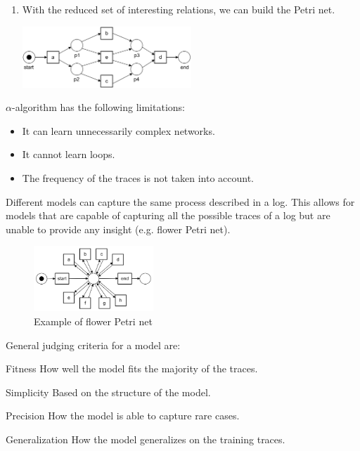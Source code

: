 \begin{description}
\begin{example}
\begin{enumerate}
                \item With the reduced set of interesting relations, we can build the Petri net.
                    \begin{center}
                        \includegraphics[width=0.5\textwidth]{img/alpha_algorithm_example.png}
                    \end{center}
            \end{enumerate}
        \end{example}

        $\alpha$-algorithm has the following limitations:
        \begin{itemize}
            \item It can learn unnecessarily complex networks.
            \item It cannot learn loops.
            \item The frequency of the traces is not taken into account.
        \end{itemize}


    \item[Model evaluation]
        Different models can capture the same process described in a log.
        This allows for models that are capable of capturing all the possible traces of a log but 
        are unable to provide any insight (e.g. flower Petri net).

        \begin{figure}[H]
            \centering
            \includegraphics[width=0.4\textwidth]{img/flower_petri.png}
            \caption{Example of flower Petri net}
        \end{figure}

        General judging criteria for a model are:
        \begin{descriptionlist}
            \item[Fitness] 
                How well the model fits the majority of the traces.
            \item[Simplicity] 
                Based on the structure of the model.
            \item[Precision] 
                How the model is able to capture rare cases.
            \item[Generalization] 
                How the model generalizes on the training traces.
        \end{descriptionlist}
\end{description}



